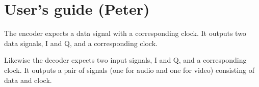 \section{User's guide (Peter)}
The encoder expects a data signal with a corresponding clock. It outputs two data signals, I and Q, and a corresponding clock.

Likewise the decoder expects two input signals, I and Q, and a corresponding clock. It outputs a pair of signals (one for audio and one for video) consisting of data and clock.
